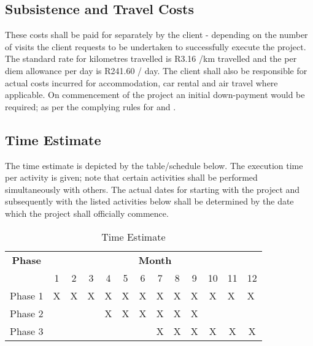 \subsection{Subsistence and Travel Costs}
These costs shall be paid for separately by the client - depending on the number of visits the client requests to be undertaken to successfully execute the project.  The standard rate for kilometres travelled is R3.16 /km travelled and the per diem allowance per day is R241.60 / day. The client shall also be responsible for actual costs incurred for accommodation, car rental and air travel where applicable. On commencement of the project an initial down-payment would be required; as per the complying rules for \vendor and \client.
\clearpage
\subsection{Time Estimate}
The time estimate is depicted by the table/schedule below. The execution time per activity is given; note that certain activities shall be performed simultaneously with others.  The actual dates for starting with the project and subsequently with the listed activities below shall be determined by the date which the project shall officially commence.
\begin{table}[htbp]
\centering
\caption{Time Estimate}
\begin{tabular}{|l|c|c|c|c|c|c|c|c|c|c|l|l|}
\hline
\multicolumn{ 1}{|c|}{\textbf{Phase}} & \multicolumn{ 12}{c|}{\textbf{Month}} \\ \cline{ 2- 13}
\multicolumn{ 1}{|l|}{} & 1 & 2 & 3 & 4 & 5 & 6 & 7 & 8 & 9 & 10 & \multicolumn{1}{c|}{11} & \multicolumn{1}{c|}{12} \\ \hline
Phase 1 & X & X & X &X  & X & X & X & X & X & X & X & X  \\ \hline
Phase 2 &  &  &  & X & X & X & X & X & X &  &  &  \\ \hline
Phase 3 &  &  &  &  &  &  & X & X & X & X & \multicolumn{1}{c|}{X} & \multicolumn{1}{c|}{X} \\ \hline
\end{tabular}
\label{}
\end{table}

